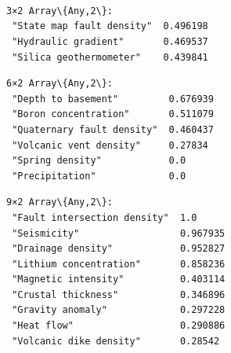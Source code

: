 \documentclass[11pt]{article}
\begin{document}
    \begin{Verbatim}[commandchars=\\\{\}]

    \end{Verbatim}

    \begin{center}
    \end{center}
    { \hspace*{\fill} \\}
    
    \begin{center}
    \end{center}
    { \hspace*{\fill} \\}
    
    \begin{Verbatim}[commandchars=\\\{\}]

    \end{Verbatim}

    \begin{center}
    \end{center}
    { \hspace*{\fill} \\}
    
    
    \begin{Verbatim}[commandchars=\\\{\}]
3×2 Array\{Any,2\}:
 "State map fault density"  0.496198
 "Hydraulic gradient"       0.469537
 "Silica geothermometer"    0.439841
    \end{Verbatim}

    
    
    \begin{Verbatim}[commandchars=\\\{\}]
6×2 Array\{Any,2\}:
 "Depth to basement"         0.676939
 "Boron concentration"       0.511079
 "Quaternary fault density"  0.460437
 "Volcanic vent density"     0.27834
 "Spring density"            0.0
 "Precipitation"             0.0
    \end{Verbatim}

    
    
    \begin{Verbatim}[commandchars=\\\{\}]
9×2 Array\{Any,2\}:
 "Fault intersection density"  1.0
 "Seismicity"                  0.967935
 "Drainage density"            0.952827
 "Lithium concentration"       0.858236
 "Magnetic intensity"          0.403114
 "Crustal thickness"           0.346896
 "Gravity anomaly"             0.297228
 "Heat flow"                   0.290886
 "Volcanic dike density"       0.28542
    \end{Verbatim}
\end{document}
